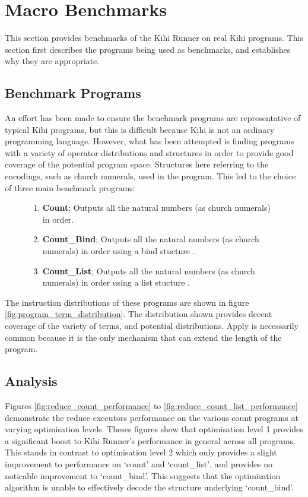 \section{Macro Benchmarks}
This section provides benchmarks of the Kihi Runner on real Kihi programs. This section first describes the programs being used as benchmarks, and establishes why they are appropriate. 

\subsection{Benchmark Programs}
An effort has been made to ensure the benchmark programs are representative of typical Kihi programs, but this is difficult because Kihi is not an ordinary programming language. However, what has been attempted is finding programs with a variety of operator distributions and structures in order to provide good coverage of the potential program space. Structures here referring to the encodings, such as church numerals, used in the program. This led to the choice of three main benchmark programs:

\begin{figure}[H]
\centering
\begin{enumerate}
    \item \textbf{Count}; Outputs all the natural numbers (as church numerals) in order.
    \item \textbf{Count\_Bind}; Outputs all the natural numbers (as church numerals) in order using a bind stucture \cite{jones2018practice}.
    \item \textbf{Count\_List}; Outputs all the natural numbers (as church numerals) in order using a list stucture \cite{jones2018practice}.
\end{enumerate}
\end{figure}

The instruction distributions of these programs are shown in figure \ref{fig:program_term_distribution}. The distribution shown provides decent coverage of the variety of terms, and potential distributions. Apply is necessarily common because it is the only mechanism that can extend the length of the program.



\subsection{Analysis}
Figures \ref{fig:reduce_count_performance} to \ref{fig:reduce_count_list_performance} demonstrate the reduce executors performance on the various count programs at varying optimisation levels. Theses figures show that optimisation level 1 provides a significant boost to Kihi Runner's performance in general across all programs. This stands in contrast to optimisation level 2 which only provides a slight improvement to performance on `count' and `count\_list', and provides no noticable improvement to `count\_bind'. This suggests that the optimisation algorithm is unable to effectively decode the structure underlying `count\_bind'.

